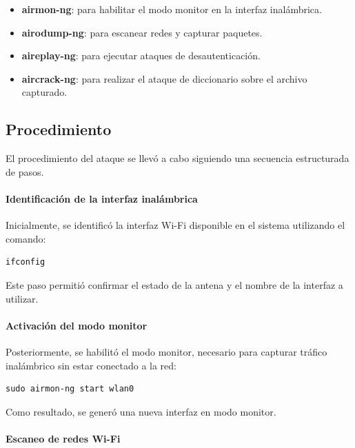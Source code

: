 \begin{itemize}
    \item \textbf{airmon-ng}: para habilitar el modo monitor en la interfaz inalámbrica.
    \item \textbf{airodump-ng}: para escanear redes y capturar paquetes.
    \item \textbf{aireplay-ng}: para ejecutar ataques de desautenticación.
    \item \textbf{aircrack-ng}: para realizar el ataque de diccionario sobre el archivo capturado.
\end{itemize}

\subsection{Procedimiento}

El procedimiento del ataque se llevó a cabo siguiendo una secuencia estructurada de pasos.

\paragraph{Identificación de la interfaz inalámbrica}

Inicialmente, se identificó la interfaz Wi-Fi disponible en el sistema utilizando el comando:

\begin{lstlisting}[caption={Identificación de la interfaz inalámbrica}]
ifconfig
\end{lstlisting}

Este paso permitió confirmar el estado de la antena y el nombre de la interfaz a utilizar.

\paragraph{Activación del modo monitor}

Posteriormente, se habilitó el modo monitor, necesario para capturar tráfico inalámbrico sin estar conectado a la red:

\begin{lstlisting}[caption={Activación del modo monitor}]
sudo airmon-ng start wlan0
\end{lstlisting}

Como resultado, se generó una nueva interfaz en modo monitor.

\paragraph{Escaneo de redes Wi-Fi}

